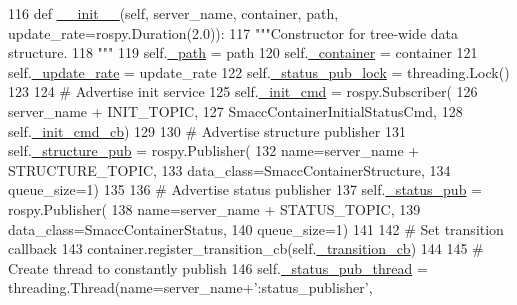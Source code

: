 \begin{DoxyCode}
116     \textcolor{keyword}{def }\hyperlink{classsmacc__viewer_1_1introspection__container_1_1ContainerProxy_a10bb912a8cee1f958ab2359344fc04b0}{\_\_init\_\_}(self, server\_name, container, path, update\_rate=rospy.Duration(2.0)):
117         \textcolor{stringliteral}{"""Constructor for tree-wide data structure.}
118 \textcolor{stringliteral}{        """}
119         self.\hyperlink{classsmacc__viewer_1_1introspection__container_1_1ContainerProxy_a1196c9f62c5bf656de0dddba97f57884}{\_path} = path
120         self.\hyperlink{classsmacc__viewer_1_1introspection__container_1_1ContainerProxy_a3148d29e291a87befdab3faa03ed6c62}{\_container} = container
121         self.\hyperlink{classsmacc__viewer_1_1introspection__container_1_1ContainerProxy_a0c5222106d95d0d78632d21873b7d2a8}{\_update\_rate} = update\_rate
122         self.\hyperlink{classsmacc__viewer_1_1introspection__container_1_1ContainerProxy_a666abcc33df4a2601f414eb66867a634}{\_status\_pub\_lock} = threading.Lock()
123 
124         \textcolor{comment}{# Advertise init service}
125         self.\hyperlink{classsmacc__viewer_1_1introspection__container_1_1ContainerProxy_a32df154fd0035346ac0ba4032f67e73e}{\_init\_cmd} = rospy.Subscriber(
126                 server\_name + INIT\_TOPIC,
127                 SmaccContainerInitialStatusCmd,
128                 self.\hyperlink{classsmacc__viewer_1_1introspection__container_1_1ContainerProxy_ac2ba62ed1b72c1dc6ea8e5badb6f2030}{\_init\_cmd\_cb})
129 
130         \textcolor{comment}{# Advertise structure publisher}
131         self.\hyperlink{classsmacc__viewer_1_1introspection__container_1_1ContainerProxy_a3bea5a75a0e6fe5533d7d4603c00bd8a}{\_structure\_pub} = rospy.Publisher(
132                 name=server\_name + STRUCTURE\_TOPIC,
133                 data\_class=SmaccContainerStructure,
134                 queue\_size=1)
135 
136         \textcolor{comment}{# Advertise status publisher}
137         self.\hyperlink{classsmacc__viewer_1_1introspection__container_1_1ContainerProxy_ac1f04f2ed4690fc523f493f046b45429}{\_status\_pub} = rospy.Publisher(
138                 name=server\_name + STATUS\_TOPIC,
139                 data\_class=SmaccContainerStatus,
140                 queue\_size=1)
141 
142         \textcolor{comment}{# Set transition callback}
143         container.register\_transition\_cb(self.\hyperlink{classsmacc__viewer_1_1introspection__container_1_1ContainerProxy_afdf0dd6e6c530d1906fd4a253c8db883}{\_transition\_cb})
144 
145         \textcolor{comment}{# Create thread to constantly publish}
146         self.\hyperlink{classsmacc__viewer_1_1introspection__container_1_1ContainerProxy_a87e0bcbc92c4e5ec369758ea926384b5}{\_status\_pub\_thread} = threading.Thread(name=server\_name+\textcolor{stringliteral}{':status\_publisher'},

\end{DoxyCode}
